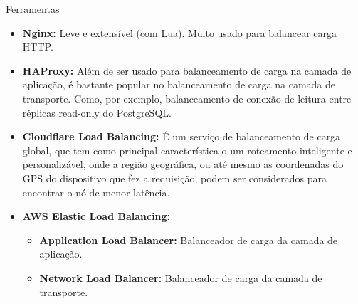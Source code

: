 \begin{frame}[fragile]{Ferramentas}
    \begin{itemize}%
        \item \textbf{Nginx:} Leve e extensível (com Lua). Muito usado para balancear carga HTTP.
        \item \textbf{HAProxy:} Além de ser usado para balanceamento de carga na camada de aplicação, é bastante popular no balanceamento de carga na camada de transporte. Como, por exemplo, balanceamento de conexão de leitura entre réplicas read-only do PostgreSQL.
        \item \textbf{Cloudflare Load Balancing:} É um serviço de balanceamento de carga global, que tem como principal característica o um roteamento inteligente e personalizável, onde a região geográfica, ou até mesmo as coordenadas do GPS do dispositivo que fez a requisição, podem ser considerados para encontrar o nó de menor latência.
        \item \textbf{AWS Elastic Load Balancing:}
        \begin{itemize}
            \item \textbf{Application Load Balancer:} Balanceador de carga da camada de aplicação.
            \item \textbf{Network Load Balancer:} Balanceador de carga da camada de transporte.
        \end{itemize}
    \end{itemize}
\end{frame}